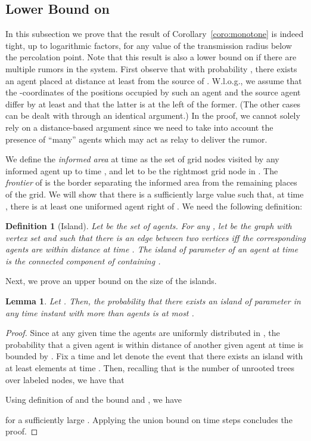 \documentclass[11pt]{article}
\newcommand{\newterm}[1]{\emph{#1}}
\newtheorem{defi}{Definition}
\newtheorem{lemm}{Lemma}
\begin{document}
\subsection{Lower Bound on }
\label{sec:gslb}

In this subsection we prove that the result of
Corollary~\ref{coro:monotone} is indeed tight, up to logarithmic
factors, for any value  of the transmission radius below the
percolation point.  Note that this result is also a lower bound on
 if there are multiple rumors in the system.  First observe that
with probability , there exists an agent placed at
distance at least  from the source of .
W.l.o.g., we assume that the -coordinates of the positions occupied
by such an agent and the source agent differ by at least 
and that the latter is at the left of the former.  (The other cases
can be dealt with through an identical argument.)  In the proof, we
cannot solely rely on a distance-based argument since we need to take
into account the presence of ``many'' agents which may act as relay to
deliver the rumor.

We define the \emph{informed area}  at time  as the set of
grid nodes visited by any informed agent up to time , and let
 to be the rightmost grid node in .  The
\newterm{frontier} of  is the border separating the informed
area from the remaining places of the grid.  We will show that there is
a sufficiently large value  such that, at time , there is at
least one uniformed agent right of .  We need the
following definition:
\begin{defi}[Island]
\label{defi:Island}
Let  be the set of agents.  For any , let 
be the graph with vertex set  and such that there is an edge
between two vertices iff the corresponding agents are within distance
 at time .
The \newterm{island} of parameter  of
an agent  at time  is the connected component of  containing .
\end{defi}
Next, we prove an upper bound on the size of the islands.
\begin{lemm}
\label{lemm:NoBigNeighborhood}
Let .
Then, the probability that there exists
an island of parameter 
in any time instant 
with more than  agents is at most .
\end{lemm}
\begin{proof}
Since at any given time the agents are uniformly distributed in ,
the probability that a given agent is within distance 
of another given agent at time  is bounded by .
Fix a time  and let  denote the event that
there exists an island with at least  elements at time . 
Then, recalling that  is the number of unrooted 
trees over  labeled nodes, we have that 

Using definition of  and the bound  and , we have 

for a sufficiently large .
Applying the union bound on  time steps concludes the proof.
\end{proof}
\end{document}
